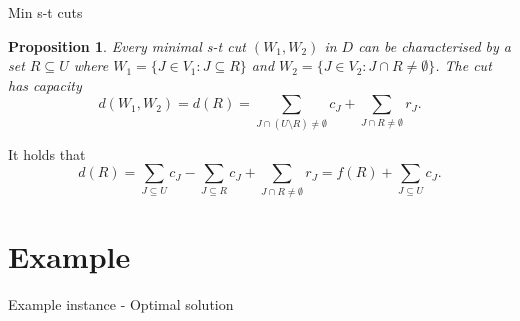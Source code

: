 \documentclass[usenames,dvipsnames]{beamer}
\newtheorem{prop}{Proposition}
\begin{document}
\begin{frame}{Min s-t cuts}
  \begin{prop}
    Every minimal s-t cut $(W_1, W_2)$ in $D$ can be characterised by
    a set $R \subseteq U$ where $W_1 = \{J \in V_1: J \subseteq R\}$
    and $W_2 = \{J \in V_2: J \cap R \neq \emptyset\}$. The cut has
    capacity \[d(W_1, W_2) = d(R) = \sum\limits_{J \cap (U \setminus
      R) \neq \emptyset} c_J + \sum\limits_{J \cap R \neq \emptyset}
    r_J.\]
  \end{prop}
It holds that  \[d(R) = \sum\limits_{J \subseteq U} c_J - \sum\limits_{J \subseteq R} c_J + \sum\limits_{J \cap R \neq \emptyset} r_J = f(R) + \sum\limits_{J \subseteq U} c_J.\]
\end{frame}

\section{Example}
\begin{frame}[fragile]{Example instance - Optimal solution}
  \begin{minipage}{0.49\textwidth}
  
  \end{minipage}
  \begin{minipage}{0.49\textwidth}
    \begin{center}
    \end{center}
  \end{minipage}
\end{frame}
\end{document}
